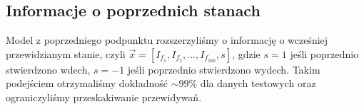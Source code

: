 \documentclass{article}
\begin{document}
\subsection{Informacje o poprzednich stanach}
Model z poprzedniego podpunktu rozszerzyliśmy o informację o wcześniej przewidzianym stanie, czyli 
$\vec{x} = [I_{f_1}, I_{f_2}, ..., I_{f_160},  s]$, gdzie $s = 1$ jeśli poprzednio stwierdzono wdech, $s=-1$ jeśli poprzednio stwierdzono wydech.
Takim podejściem otrzymaliśmy dokładność $\sim 99\%$ dla danych testowych oraz ograniczyliśmy przeskakiwanie przewidywań.
\end{document}
